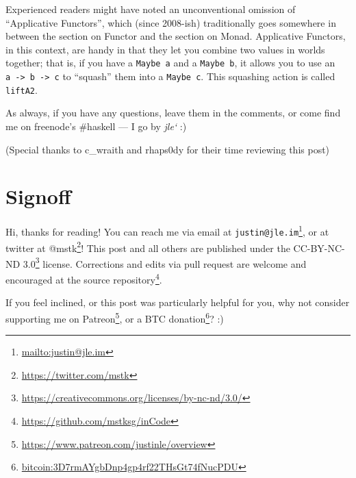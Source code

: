 \documentclass[]{article}
\renewcommand{\href}[2]{#2\footnote{\url{#1}}}
\begin{document}
Experienced readers might have noted an unconventional omission of ``Applicative
Functors'', which (since 2008-ish) traditionally goes somewhere in between the
section on Functor and the section on Monad. Applicative Functors, in this
context, are handy in that they let you combine two values in worlds together;
that is, if you have a \texttt{Maybe\ a} and a \texttt{Maybe\ b}, it allows you
to use an \texttt{a\ -\textgreater{}\ b\ -\textgreater{}\ c} to ``squash'' them
into a \texttt{Maybe\ c}. This squashing action is called \texttt{liftA2}.

As always, if you have any questions, leave them in the comments, or come find
me on freenode's \#haskell --- I go by \emph{jle`} :)

(Special thanks to c\_wraith and rhaps0dy for their time reviewing this post)

\hypertarget{signoff}{%
\section{Signoff}\label{signoff}}

Hi, thanks for reading! You can reach me via email at
\href{mailto:justin@jle.im}{\nolinkurl{justin@jle.im}}, or at twitter at
\href{https://twitter.com/mstk}{@mstk}! This post and all others are published
under the \href{https://creativecommons.org/licenses/by-nc-nd/3.0/}{CC-BY-NC-ND
3.0} license. Corrections and edits via pull request are welcome and encouraged
at \href{https://github.com/mstksg/inCode}{the source repository}.

If you feel inclined, or this post was particularly helpful for you, why not
consider \href{https://www.patreon.com/justinle/overview}{supporting me on
Patreon}, or a \href{bitcoin:3D7rmAYgbDnp4gp4rf22THsGt74fNucPDU}{BTC donation}?
:)
\end{document}
